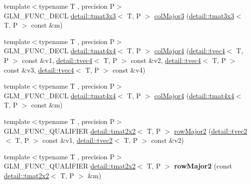 \begin{DoxyCompactItemize}
\item 
{\footnotesize template$<$typename T , precision P$>$ }\\G\+L\+M\+\_\+\+F\+U\+N\+C\+\_\+\+D\+E\+CL \hyperlink{structglm_1_1detail_1_1tmat3x3}{detail\+::tmat3x3}$<$ T, P $>$ \hyperlink{group__gtx__matrix__major__storage_ga40caccd20b8afb6de68c626efc376927}{col\+Major3} (\hyperlink{structglm_1_1detail_1_1tmat3x3}{detail\+::tmat3x3}$<$ T, P $>$ const \&m)
\item 
{\footnotesize template$<$typename T , precision P$>$ }\\G\+L\+M\+\_\+\+F\+U\+N\+C\+\_\+\+D\+E\+CL \hyperlink{structglm_1_1detail_1_1tmat4x4}{detail\+::tmat4x4}$<$ T, P $>$ \hyperlink{group__gtx__matrix__major__storage_ga50e127c56370410d8054be2cdef03503}{col\+Major4} (\hyperlink{structglm_1_1detail_1_1tvec4}{detail\+::tvec4}$<$ T, P $>$ const \&v1, \hyperlink{structglm_1_1detail_1_1tvec4}{detail\+::tvec4}$<$ T, P $>$ const \&v2, \hyperlink{structglm_1_1detail_1_1tvec4}{detail\+::tvec4}$<$ T, P $>$ const \&v3, \hyperlink{structglm_1_1detail_1_1tvec4}{detail\+::tvec4}$<$ T, P $>$ const \&v4)
\item 
{\footnotesize template$<$typename T , precision P$>$ }\\G\+L\+M\+\_\+\+F\+U\+N\+C\+\_\+\+D\+E\+CL \hyperlink{structglm_1_1detail_1_1tmat4x4}{detail\+::tmat4x4}$<$ T, P $>$ \hyperlink{group__gtx__matrix__major__storage_ga89086c0396205669304be98a8c601b78}{col\+Major4} (\hyperlink{structglm_1_1detail_1_1tmat4x4}{detail\+::tmat4x4}$<$ T, P $>$ const \&m)
\item 
{\footnotesize template$<$typename T , precision P$>$ }\\G\+L\+M\+\_\+\+F\+U\+N\+C\+\_\+\+Q\+U\+A\+L\+I\+F\+I\+ER \hyperlink{structglm_1_1detail_1_1tmat2x2}{detail\+::tmat2x2}$<$ T, P $>$ \hyperlink{group__gtx__matrix__major__storage_ga63d72819ad07f4f875a0565f1462652b}{row\+Major2} (\hyperlink{structglm_1_1detail_1_1tvec2}{detail\+::tvec2}$<$ T, P $>$ const \&v1, \hyperlink{structglm_1_1detail_1_1tvec2}{detail\+::tvec2}$<$ T, P $>$ const \&v2)
\item 
{\footnotesize template$<$typename T , precision P$>$ }\\G\+L\+M\+\_\+\+F\+U\+N\+C\+\_\+\+Q\+U\+A\+L\+I\+F\+I\+ER \hyperlink{structglm_1_1detail_1_1tmat2x2}{detail\+::tmat2x2}$<$ T, P $>$ {\bfseries row\+Major2} (const \hyperlink{structglm_1_1detail_1_1tmat2x2}{detail\+::tmat2x2}$<$ T, P $>$ \&m)\hypertarget{namespaceglm_a9067f7e92c22032780bd567c1e556780}{}\label{namespaceglm_a9067f7e92c22032780bd567c1e556780}


\end{DoxyCompactItemize}
